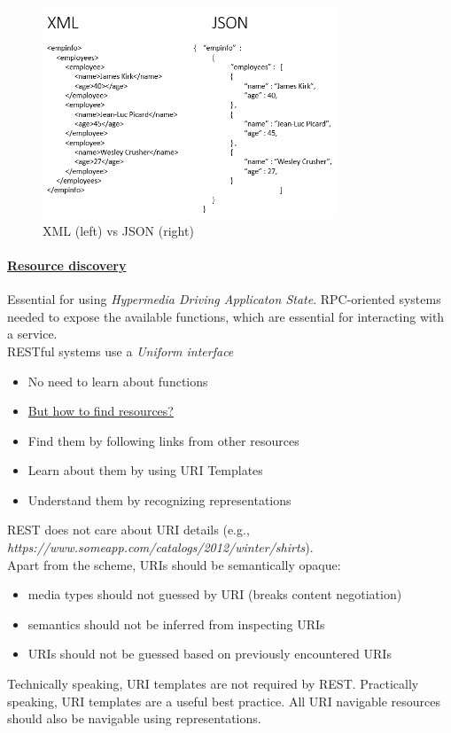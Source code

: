 \documentclass[10pt,a4paper]{article}
\begin{document}
  \begin{figure}[ht!]
 \hfill \includegraphics[width=250pt]{images/xml-vs-json}
 \hspace*{\fill}
 \caption{XML (left) vs JSON (right)}
 \end{figure}
\paragraph{\uline{Resource discovery}} Essential for using \textit{Hypermedia Driving Applicaton State}. RPC-oriented systems needed to expose the available functions, which are essential for interacting with a service. \\
 RESTful systems use a \textit{Uniform interface}
 \begin{itemize}
 	\item No need to learn about functions
 	\item \uline{But how to find resources?}
 	\item Find them by following links from other resources
 	\item Learn about them by using URI Templates
 	\item Understand them by recognizing representations
 \end{itemize}
 REST does not care about URI details (e.g., \textit{https://www.someapp.com/catalogs/2012/winter/shirts}). \\
 Apart from the scheme, URIs should be semantically opaque:
 \begin{itemize}
 	\item media types should not guessed by URI (breaks content negotiation)
 	\item semantics should not be inferred from inspecting URIs
 	\item URIs should not be guessed based on previously encountered URIs
 \end{itemize}
 Technically speaking, URI templates are not required by REST. Practically speaking, URI templates are a useful best practice. All URI navigable resources should also be navigable using representations.
 \pagebreak
\end{document}
